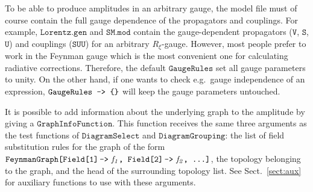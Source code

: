 \documentclass[twoside,12pt]{article}
\let\dots\textellipsis
\def\eg{e.g.\ }
\def\lbrac{\symbol{123}}
\def\rbrac{\symbol{125}}
\def\Brac#1{\lbrac#1\rbrac}
\def\Code#1{\ensuremath{\texttt{#1}}}
\def\Var#1{\ensuremath{\mathit{#1}}}
\begin{document}
To be able to produce amplitudes in an arbitrary gauge, the model file
must of course contain the full gauge dependence of the propagators and
couplings.  For example, \Code{Lorentz.gen} and \Code{SM.mod} contain the
gauge-dependent propagators (\Code{V}, \Code{S}, \Code{U}) and couplings
(\Code{SUU}) for an arbitrary $R_\xi$-gauge.  However, most people prefer 
to work in the Feynman gauge which is the most convenient one for 
calculating radiative corrections.  Therefore, the default
\Code{GaugeRules} set all gauge parameters to unity.  On the other hand, if 
one wants to check \eg gauge independence of an expression,
\Code{GaugeRules -> \Brac{}} will keep the gauge parameters untouched.%
%

It is possible to add information about the underlying graph to the 
amplitude by giving a \Code{GraphInfoFunction}.  This function receives 
the same three arguments as the test functions of \Code{DiagramSelect} 
and \Code{DiagramGrouping}: the list of field substitution rules for the 
graph of the form \Code{FeynmanGraph[Field[1]\,->\,\,\Var{f_1}, 
Field[2]\,->\,\,\Var{f_2}, \dots]}, the topology belonging to the graph, 
and the head of the surrounding topology list.  See Sect.~\ref{sect:aux} 
for auxiliary functions to use with these arguments.

\bigskip
\end{document}
